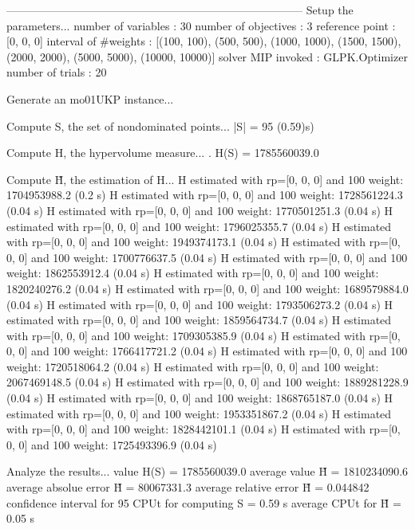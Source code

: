 --------------------------------------------------------------------------------
Setup the parameters...
  number of variables  : 30
  number of objectives : 3
  reference point      : [0, 0, 0]
  interval of #weights : [(100, 100), (500, 500), (1000, 1000), (1500, 1500), (2000, 2000), (5000, 5000), (10000, 10000)]
  solver MIP invoked   : GLPK.Optimizer
  number of trials     : 20

Generate an mo01UKP instance...

Compute S, the set of nondominated points...
  |S|  = 95 (0.59)s)

Compute H, the hypervolume measure...
. H(S) = 1785560039.0

Compute H̃, the estimation of H...
  H estimated with rp=[0, 0, 0] and 100 weight:  1704953988.2  (0.2 s)
  H estimated with rp=[0, 0, 0] and 100 weight:  1728561224.3  (0.04 s)
  H estimated with rp=[0, 0, 0] and 100 weight:  1770501251.3  (0.04 s)
  H estimated with rp=[0, 0, 0] and 100 weight:  1796025355.7  (0.04 s)
  H estimated with rp=[0, 0, 0] and 100 weight:  1949374173.1  (0.04 s)
  H estimated with rp=[0, 0, 0] and 100 weight:  1700776637.5  (0.04 s)
  H estimated with rp=[0, 0, 0] and 100 weight:  1862553912.4  (0.04 s)
  H estimated with rp=[0, 0, 0] and 100 weight:  1820240276.2  (0.04 s)
  H estimated with rp=[0, 0, 0] and 100 weight:  1689579884.0  (0.04 s)
  H estimated with rp=[0, 0, 0] and 100 weight:  1793506273.2  (0.04 s)
  H estimated with rp=[0, 0, 0] and 100 weight:  1859564734.7  (0.04 s)
  H estimated with rp=[0, 0, 0] and 100 weight:  1709305385.9  (0.04 s)
  H estimated with rp=[0, 0, 0] and 100 weight:  1766417721.2  (0.04 s)
  H estimated with rp=[0, 0, 0] and 100 weight:  1720518064.2  (0.04 s)
  H estimated with rp=[0, 0, 0] and 100 weight:  2067469148.5  (0.04 s)
  H estimated with rp=[0, 0, 0] and 100 weight:  1889281228.9  (0.04 s)
  H estimated with rp=[0, 0, 0] and 100 weight:  1868765187.0  (0.04 s)
  H estimated with rp=[0, 0, 0] and 100 weight:  1953351867.2  (0.04 s)
  H estimated with rp=[0, 0, 0] and 100 weight:  1828442101.1  (0.04 s)
  H estimated with rp=[0, 0, 0] and 100 weight:  1725493396.9  (0.04 s)

Analyze the results...
  value H(S)                  = 1785560039.0 
  average value H̃             = 1810234090.6 
  average absolue error H̃     = 80067331.3 
  average relative error H̃    = 0.044842 
  confidence interval for 95%
  CPUt for computing S         = 0.59 s
  average CPUt for H̃           = 0.05 s

